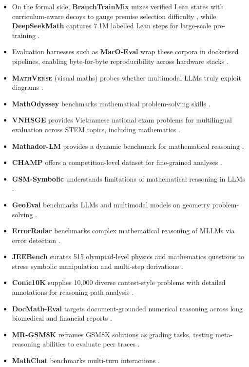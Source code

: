 \documentclass[acmsmall,anonymous]{acmart}
\begin{document}
\begin{itemize}
    \item On the formal side, \textbf{BranchTrainMix} mixes verified Lean states with curriculum‐aware decoys to gauge premise selection difficulty \cite{wang2024branchtrainmix}, while \textbf{DeepSeekMath} captures 7.1M labelled Lean steps for large‐scale pre-training \cite{shao2024deepseekmath}.  
    \item Evaluation harnesses such as \textbf{MarO‐Eval} wrap these corpora in dockerised pipelines, enabling byte‐for‐byte reproducibility across hardware stacks \cite{zhang2024marioeval}.  
    \item \textbf{\textsc{MathVerse}} (visual maths) probes whether multimodal LLMs truly exploit diagrams \cite{zhang2024mathverse}.
    \item \textbf{MathOdyssey} benchmarks mathematical problem-solving skills \cite{fang2024}.
    \item \textbf{VNHSGE} provides Vietnamese national exam problems for multilingual evaluation across STEM topics, including mathematics \cite{dao-2023-vnhsge}.
    \item \textbf{Mathador-LM} provides a dynamic benchmark for mathematical reasoning \cite{kurtic2024}.
    \item \textbf{CHAMP} offers a competition-level dataset for fine-grained analyses \cite{mao2024}.
    \item \textbf{GSM-Symbolic} understands limitations of mathematical reasoning in LLMs \cite{mirzadeh2024}.
    \item \textbf{GeoEval} benchmarks LLMs and multimodal models on geometry problem-solving \cite{zhang2024d}.
    \item \textbf{ErrorRadar} benchmarks complex mathematical reasoning of MLLMs via error detection \cite{yan2024a}.
    \item \textbf{JEEBench} curates 515 olympiad-level physics and mathematics questions to stress symbolic manipulation and multi-step derivations \cite{arora-2023-jeebench}.
    \item \textbf{Conic10K} supplies 10{,}000 diverse contest-style problems with detailed annotations for reasoning path analysis \cite{wu-2023-conic10k}.
    \item \textbf{DocMath-Eval} targets document-grounded numerical reasoning across long biomedical and financial reports \cite{zhao-2024-docmatheval}.
    \item \textbf{MR-GSM8K} reframes GSM8K solutions as grading tasks, testing meta-reasoning abilities to evaluate peer traces \cite{zeng-2024-mr-gsm8k}.
    \item \textbf{MathChat} benchmarks multi-turn interactions \cite{liang2024c}.
\end{itemize}
\end{document}
